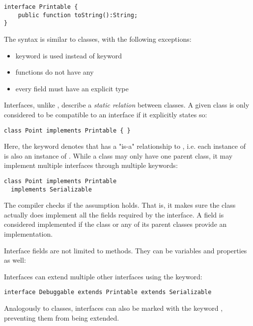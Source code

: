 \begin{lstlisting}
interface Printable {
	public function toString():String;
}
\end{lstlisting}
The syntax is similar to classes, with the following exceptions:

\begin{itemize}
	\item {} keyword is used instead of  keyword
	\item functions do not have any 
	\item every field must have an explicit type
\end{itemize}
Interfaces, unlike , describe a \emph{static relation} between classes. A given class is only considered to be compatible to an interface if it explicitly states so:

\begin{lstlisting}
class Point implements Printable { }
\end{lstlisting}
Here, the  keyword denotes that  has a "is-a" relationship to , i.e. each instance of  is also an instance of . While a class may only have one parent class, it may implement multiple interfaces through multiple  keywords:

\begin{lstlisting}
class Point implements Printable
  implements Serializable
\end{lstlisting}

The compiler checks if the  assumption holds. That is, it makes sure the class actually does implement all the fields required by the interface. A field is considered implemented if the class or any of its parent classes provide an implementation.

Interface fields are not limited to methods. They can be variables and properties as well:


Interfaces can extend multiple other interfaces using the  keyword:
\begin{lstlisting}
interface Debuggable extends Printable extends Serializable
\end{lstlisting}


Analogously to classes, interfaces can also be marked with the keyword , preventing them from being extended.


